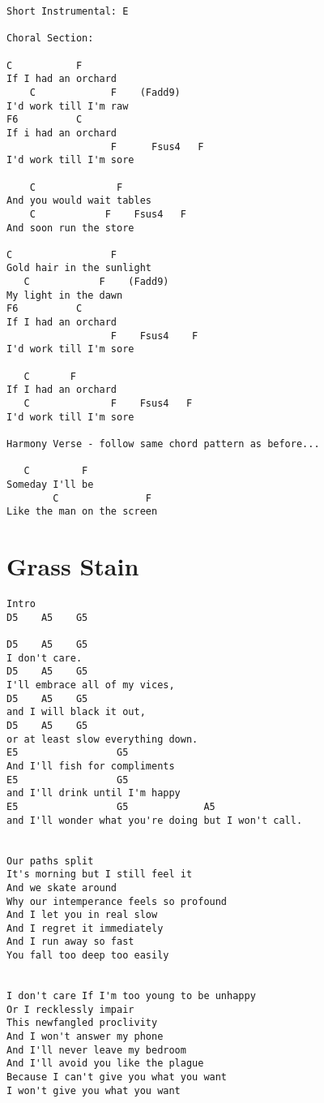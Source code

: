 \documentclass[leqno]{memoir}
\begin{document}
\begin{verbatim}
Short Instrumental: E

Choral Section:

C           F
If I had an orchard
    C             F    (Fadd9)
I'd work till I'm raw
F6          C
If i had an orchard
                  F      Fsus4   F
I'd work till I'm sore

    C              F
And you would wait tables
    C            F    Fsus4   F
And soon run the store

C                 F
Gold hair in the sunlight
   C            F    (Fadd9)
My light in the dawn
F6          C
If I had an orchard
                  F    Fsus4    F
I'd work till I'm sore

   C       F
If I had an orchard
   C              F    Fsus4   F
I'd work till I'm sore

Harmony Verse - follow same chord pattern as before...

   C         F
Someday I'll be
        C               F
Like the man on the screen

\end{verbatim}
\newpage

\chapter{Grass Stain}
\begin{verbatim}
Intro
D5    A5    G5

D5    A5    G5
I don't care.
D5    A5    G5
I'll embrace all of my vices,
D5    A5    G5
and I will black it out,
D5    A5    G5
or at least slow everything down.
E5                 G5
And I'll fish for compliments
E5                 G5
and I'll drink until I'm happy
E5                 G5             A5
and I'll wonder what you're doing but I won't call.


Our paths split
It's morning but I still feel it
And we skate around
Why our intemperance feels so profound
And I let you in real slow
And I regret it immediately
And I run away so fast
You fall too deep too easily


I don't care If I'm too young to be unhappy
Or I recklessly impair
This newfangled proclivity
And I won't answer my phone
And I'll never leave my bedroom
And I'll avoid you like the plague
Because I can't give you what you want
I won't give you what you want 
\end{verbatim}
\newpage
\end{document}
